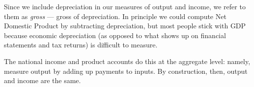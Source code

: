 \documentclass[12pt,letterpaper]{article}
\begin{document}
Since we include depreciation in our measures of output and income,
we refer to them as \textit{gross} --- gross of depreciation.
In principle we could compute Net Domestic Product
by subtracting depreciation, but most people stick with GDP because
economic depreciation (as opposed to what shows up on financial
statements and tax returns) is difficult to measure.


The national income and product accounts do this at the aggregate level:
namely, measure output by adding up payments to inputs.
By construction, then, output and income are the same.
%
%
\begin{comment}
There's no need to remember the details, but it gives you a sense
of the complexities that arise in the real world. Line 1 is labor
expenses, lines 3-7 are payments to capital, and line 2 is a
combination (for unincorporated businesses, like farmers and
doctors, it's not easy to separate which payments are intended for
labor and which are intended for capital). On average, about
two-thirds of gross income goes to labor, the rest to capital. The
point is that GDP measures both production of goods and
services and income to workers and owners: by the logic of accounting,
the two are the same.
GDP for the same year was similar, but not exactly the same.
The difference is a statistical discrepancy (error) of 25.6b.
\end{comment}
\end{document}
